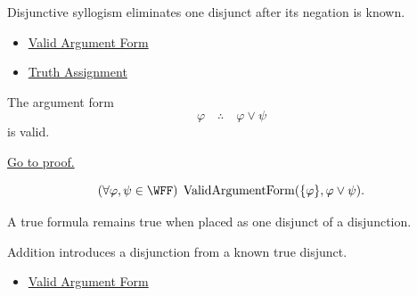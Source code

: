 \begin{remark*}[Interpretation]
Disjunctive syllogism eliminates one disjunct after its negation is known.
\end{remark*}

\begin{dependencies}
\begin{itemize}
  \item \hyperref[def:valid-argument-form-propositional-logic]{Valid Argument Form}
  \item \hyperref[def:truth-assignment-propositional-logic]{Truth Assignment}
\end{itemize}
\end{dependencies}

\begin{tcolorbox}[colback=thmbox, colframe=thmborder, arc=2pt,
  left=6pt, right=6pt, top=4pt, bottom=4pt,
  title={\small\textbf{Theorem (Addition is Valid)}},
  fonttitle=\small\bfseries]
\begin{theorem}
\label{thm:addition-validity-propositional-logic}
The argument form
\[
\varphi \quad\therefore\quad \varphi\lor\psi
\]
is valid.

\noindent\hyperref[prf:addition-validity-propositional-logic]{Go to proof.}
\end{theorem}
\end{tcolorbox}

\begin{remark*}
\[
(\forall\varphi,\psi\in\WFF)\;\operatorname{ValidArgumentForm}(\{\varphi\},\varphi\lor\psi).
\]
\end{remark*}

\begin{remark*}
A true formula remains true when placed as one disjunct of a disjunction.
\end{remark*}

\begin{remark*}[Interpretation]
Addition introduces a disjunction from a known true disjunct.
\end{remark*}

\begin{dependencies}
\begin{itemize}
  \item \hyperref[def:valid-argument-form-propositional-logic]{Valid Argument Form}
\end{itemize}
\end{dependencies}

